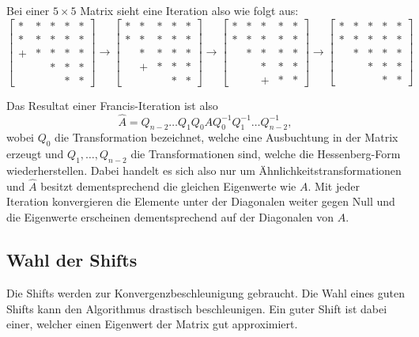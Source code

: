 Bei einer $5 \times 5$ Matrix sieht eine Iteration also wie folgt aus:
\begin{equation}
	\begin{bmatrix}
	* & * & * & * & *  \\
	* & * & *  & * & *  \\
	+ & * & * & * & *\\
	&   & * & * & * \\
	&   &   & * & * 
	\end{bmatrix} \rightarrow
	\begin{bmatrix}
	* & * & * & * & *  \\
	* & * & *  & * & *  \\
	& * & * & * & *\\
	&  + & * & * & * \\
	&   &   & * & * 
	\end{bmatrix} \rightarrow
	\begin{bmatrix}
	* & * & * & * & *  \\
	* & * & *  & * & *  \\
	& * & * & * & *\\
	&   & * & * & * \\
	&   &  + & * & * 
	\end{bmatrix} \rightarrow
	\begin{bmatrix}
	* & * & * & * & *  \\
	* & * & *  & * & *  \\
	& * & * & * & *\\
	&   & * & * & * \\
	&   &   & * & * 
	\end{bmatrix}
\end{equation}

Das Resultat einer Francis-Iteration ist also
\begin{equation}
	\hat{A}=Q_{n-2}\dots Q_{1}Q_{0}AQ_{0}^{-1}Q_{1}^{-1}\dots Q_{n-2}^{-1},
\end{equation}
wobei $Q_{0}$ die Transformation bezeichnet, welche eine Ausbuchtung in der Matrix erzeugt und $Q_{1},\dots,Q_{n-2}$ die Transformationen sind, welche die Hessenberg-Form wiederherstellen.
Dabei handelt es sich also nur um Ähnlichkeitstransformationen und $\hat{A}$ besitzt dementsprechend die gleichen Eigenwerte wie $A$.
Mit jeder Iteration konvergieren die Elemente unter der Diagonalen weiter gegen Null und die Eigenwerte erscheinen dementsprechend auf der Diagonalen von $\hat{A}$.

\subsection{Wahl der Shifts\label{francis:section:francis_iteration:wahl_shift}}
Die Shifts werden zur Konvergenzbeschleunigung gebraucht.
Die Wahl eines guten Shifts kann den Algorithmus drastisch beschleunigen. 
Ein guter Shift ist dabei einer, welcher einen Eigenwert der Matrix gut approximiert.

